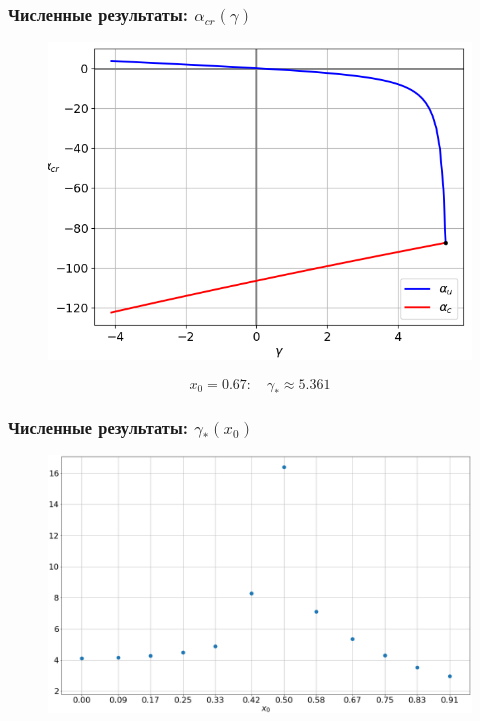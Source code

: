\documentclass[fullscreen=true, unicode, bookmarks=false]{beamer}
\begin{document}
\begin{frame}
\frametitle{ Численные результаты: $ \alpha_{cr}(\gamma) $ }

\begin{figure} 
\includegraphics[scale=0.55]{alphas_23.png}  
\end{figure}

$$ x_0 = 0.67: \quad \gamma_* \approx 5.361 $$

\end{frame}

\begin{frame}
\frametitle{ Численные результаты: $ \gamma_*(x_0) $ }

\begin{figure} 
\includegraphics[scale=0.4]{x0-gamma_star.png}  
\end{figure}

\end{frame}
\end{document}
